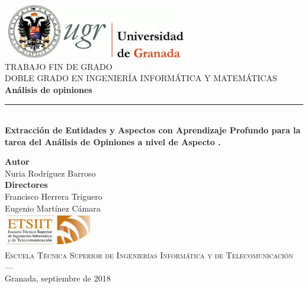 \begin{titlepage}
 
\newlength{\centeroffset}
\setlength{\centeroffset}{-0.5\oddsidemargin}
\addtolength{\centeroffset}{0.5\evensidemargin}
\thispagestyle{empty}

\noindent\hspace*{\centeroffset}\begin{minipage}{\textwidth}

\centering
\includegraphics[width=0.6\textwidth]{imagenes/logo_ugr.jpg}\\[1.4cm]

\textsc{ \Large TRABAJO FIN DE GRADO\\[0.2cm]}
\textsc{ DOBLE GRADO EN INGENIERÍA INFORMÁTICA Y MATEMÁTICAS}\\[1cm]
% 
{\Large\bfseries Análisis de opiniones \\
}
\noindent\rule[-1ex]{\textwidth}{3pt}\\[3.5ex]
{\large\bfseries Extracción de Entidades y Aspectos con Aprendizaje Profundo para la tarea del Análisis de Opiniones a nivel de Aspecto .}
\end{minipage}

\vspace{0.1cm}
\noindent\hspace*{\centeroffset}\begin{minipage}{\textwidth}
\centering

\textbf{Autor}\\ {Nuria Rodríguez Barroso}\\[2.5ex]
\textbf{Directores}\\
{Francisco Herrera Triguero\\
Eugenio Martínez Cámara}\\[2cm]
\includegraphics[width=0.3\textwidth]{imagenes/etsiit_logo.png}\\[0.1cm]
\textsc{Escuela Técnica Superior de Ingenierías Informática y de Telecomunicación}\\
\textsc{---}\\
Granada, septiembre de 2018
\end{minipage}
\end{titlepage}


